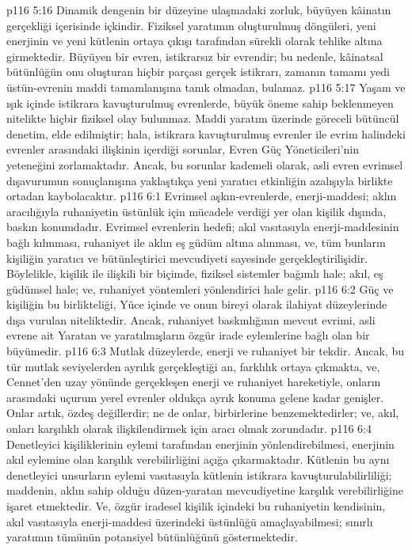 \vs p116 5:16 Dinamik dengenin bir düzeyine ulaşmadaki zorluk, büyüyen kâinatın gerçekliği içerisinde içkindir. Fiziksel yaratımın oluşturulmuş döngüleri, yeni enerjinin ve yeni kütlenin ortaya çıkışı tarafından sürekli olarak tehlike altına girmektedir. Büyüyen bir evren, istikrarsız bir evrendir; bu nedenle, kâinatsal bütünlüğün onu oluşturan hiçbir parçası gerçek istikrarı, zamanın tamamı yedi üstün\hyp{}evrenin maddi tamamlanışına tanık olmadan, bulamaz.
\vs p116 5:17 Yaşam ve ışık içinde istikrara kavuşturulmuş evrenlerde, büyük öneme sahip beklenmeyen nitelikte hiçbir fiziksel olay bulunmaz. Maddi yaratım üzerinde göreceli bütüncül denetim, elde edilmiştir; hala, istikrara kavuşturulmuş evrenler ile evrim halindeki evrenler arasındaki ilişkinin içerdiği sorunlar, Evren Güç Yöneticileri’nin yeteneğini zorlamaktadır. Ancak, bu sorunlar kademeli olarak, asli evren evrimsel dışavurumun sonuçlanışına yaklaştıkça yeni yaratıcı etkinliğin azalışıyla birlikte ortadan kaybolacaktır.
\vs p116 6:1 Evrimsel aşkın\hyp{}evrenlerde, enerji\hyp{}maddesi; aklın aracılığıyla ruhaniyetin üstünlük için mücadele verdiği yer olan kişilik dışında, baskın konumdadır. Evrimsel evrenlerin hedefi; akıl vasıtasıyla enerji\hyp{}maddesinin bağlı kılınması, ruhaniyet ile aklın eş güdüm altına alınması, ve, tüm bunların kişiliğin yaratıcı ve bütünleştirici mevcudiyeti sayesinde gerçekleştirilişidir. Böylelikle, kişilik ile ilişkili bir biçimde, fiziksel sistemler bağımlı hale; akıl, eş güdümsel hale; ve, ruhaniyet yöntemleri yönlendirici hale gelir.
\vs p116 6:2 Güç ve kişiliğin bu birlikteliği, Yüce içinde ve onun bireyi olarak ilahiyat düzeylerinde dışa vurulan niteliktedir. Ancak, ruhaniyet baskınlığının mevcut evrimi, asli evrene ait Yaratan ve yaratılmışların özgür irade eylemlerine bağlı olan bir büyümedir.
\vs p116 6:3 Mutlak düzeylerde, enerji ve ruhaniyet bir tekdir. Ancak, bu tür mutlak seviyelerden ayrılık gerçekleştiği an, farklılık ortaya çıkmakta, ve, Cennet’den uzay yönünde gerçekleşen enerji ve ruhaniyet hareketiyle, onların arasındaki uçurum yerel evrenler oldukça ayrık konuma gelene kadar genişler. Onlar artık, özdeş değillerdir; ne de onlar, birbirlerine benzemektedirler; ve, akıl, onları karşılıklı olarak ilişkilendirmek için aracı olmak zorundadır.
\vs p116 6:4 Denetleyici kişiliklerinin eylemi tarafından enerjinin yönlendirebilmesi, enerjinin akıl eylemine olan karşılık verebilirliğini açığa çıkarmaktadır. Kütlenin bu aynı denetleyici unsurların eylemi vasıtasıyla kütlenin istikrara kavuşturulabilirliliği; maddenin, aklın sahip olduğu düzen\hyp{}yaratan mevcudiyetine karşılık verebilirliğine işaret etmektedir. Ve, özgür iradesel kişilik içindeki bu ruhaniyetin kendisinin, akıl vasıtasıyla enerji\hyp{}maddesi üzerindeki üstünlüğü amaçlayabilmesi; sınırlı yaratımın tümünün potansiyel bütünlüğünü göstermektedir.
